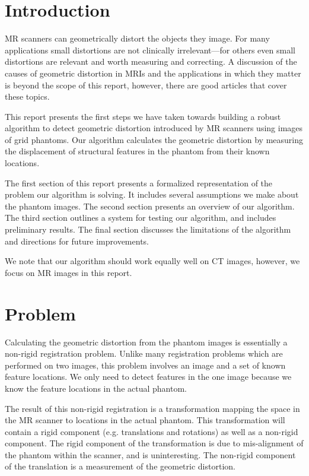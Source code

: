 \documentclass[12pt]{article}
\begin{document}
\maketitle

\section*{Introduction}
MR scanners can geometrically distort the objects they image.  For many applications small distortions are not clinically irrelevant---for others even small distortions are relevant and worth measuring and correcting.  A discussion of the causes of geometric distortion in MRIs and the applications in which they matter is beyond the scope of this report, however, there are good articles that cover these topics\cite{baldwin2007}.

This report presents the first steps we have taken towards building a robust algorithm to detect geometric distortion introduced by MR scanners using images of grid phantoms.  Our algorithm calculates the geometric distortion by measuring the displacement of structural features in the phantom from their known locations.

The first section of this report presents a formalized representation of the problem our algorithm is solving.  It includes several assumptions we make about the phantom images.  The second section presents an overview of our algorithm.  The third section outlines a system for testing our algorithm, and includes preliminary results.  The final section discusses the limitations of the algorithm and directions for future improvements.

We note that our algorithm should work equally well on CT images, however, we focus on MR images in this report.

\section*{Problem}
Calculating the geometric distortion from the phantom images is essentially a non-rigid registration problem. Unlike many registration problems which are performed on two images, this problem involves an image and a set of known feature locations.  We only need to detect features in the one image because we know the feature locations in the actual phantom.

The result of this non-rigid registration is a transformation mapping the space in the MR scanner to locations in the actual phantom.  This transformation will contain a rigid component (e.g. translations and rotations) as well as a non-rigid component.  The rigid component of the transformation is due to mis-alignment of the phantom within the scanner, and is uninteresting.  The non-rigid component of the translation is a measurement of the geometric distortion.
\end{document}
